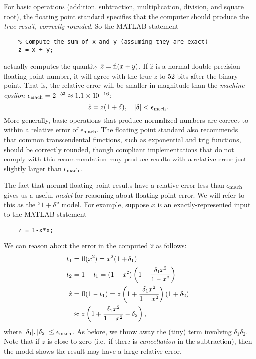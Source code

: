 \documentclass[12pt, leqno]{article}
\begin{document}
For basic operations (addition, subtraction, multiplication,
division, and square root), the floating point standard specifies that
the computer should produce the {\em true result, correctly rounded}.
So the MATLAB statement
\lstset{language=matlab,columns=flexible}
\begin{lstlisting}
    % Compute the sum of x and y (assuming they are exact)
    z = x + y;
\end{lstlisting}
actually computes the quantity $\hat{z} = \operatorname{fl}(x+y)$.  If $\hat{z}$ is
a normal double-precision floating point number, it will agree with
the true $z$ to 52 bits after the binary point.  That is, the relative
error will be smaller in magnitude than the {\em machine epsilon}
$\epsilon_{\mathrm{mach}} = 2^{-53} \approx 1.1 \times 10^{-16}$:
\[
  \hat{z} = z(1+\delta), \quad |\delta| < \epsilon_{\mathrm{mach}}.
\]
More generally, basic operations that produce normalized numbers are
correct to within a relative error of $\epsilon_{\mathrm{mach}}$.  The floating
point standard also recommends that common transcendental functions,
such as exponential and trig functions, should be correctly rounded,
though compliant implementations that do not comply with this
recommendation may produce results with a relative error
just slightly larger than $\epsilon_{\mathrm{mach}}$.

The fact that normal floating point results have a relative error
less than $\epsilon_{\mathrm{mach}}$ gives us a useful {\em model} for reasoning about
floating point error.  We will refer to this as the ``$1 + \delta$''
model.  For example, suppose $x$ is an exactly-represented input to
the MATLAB statement
\begin{lstlisting}
    z = 1-x*x;
\end{lstlisting}
We can reason about the error in the computed $\hat{z}$ as follows:
\begin{align*}
  t_1 &= \operatorname{fl}(x^2) = x^2 (1+\delta_1) \\
  t_2 &= 1-t_1 = (1-x^2)\left( 1 + \frac{\delta_1 x^2}{1-x^2} \right) \\
  \hat{z} 
  &= \operatorname{fl}(1-t_1) 
    = z \left( 1 + \frac{\delta_1 x^2}{1-x^2} \right)(1+\delta_2) \\
  & \approx z \left( 1 + \frac{\delta_1 x^2}{1-x^2} +\delta_2 \right),
\end{align*}
where $|\delta_1|, |\delta_2| \leq \epsilon_{\mathrm{mach}}$.  As before, we throw
away the (tiny) term involving $\delta_1 \delta_2$.
Note that if $z$ is close to zero (i.e.~if there is {\em cancellation} in the
subtraction), then the model shows the result may have a
large relative error.
\end{document}
